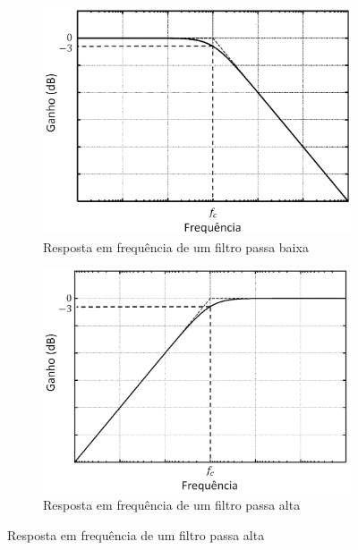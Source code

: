\begin{enumerate}[i),leftmargin=1.75cm,itemindent=0cm]
	\begin{figure}[!htbp] %
		\centering
		\begin{subfigure}[b]{0.48\textwidth}
			\centering
			\includegraphics[width=\textwidth]{Cap2/Figuras/LP_filter_BW.png}
			\caption{\centering Resposta em frequência de um filtro passa baixa} 
			\label{fig:LP_filter}
		\end{subfigure}%
		\hfill
		\begin{subfigure}[b]{0.48\textwidth}  
			\centering 
			\includegraphics[width=\textwidth]{Cap2/Figuras/HP_filter_BW.png}
			\caption{\centering Resposta em frequência de um filtro passa alta}    
			\label{fig:HP_filter}
		\end{subfigure}%

\end{figure}
\end{enumerate}
